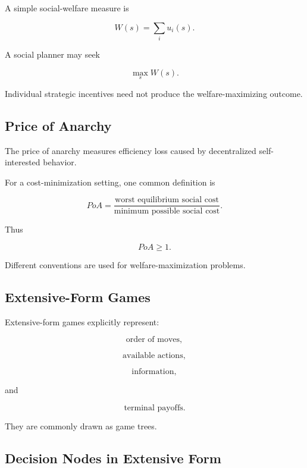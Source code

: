 A simple social-welfare measure is

\[
\boxed{
W(s)
=
\sum_i
u_i(s).
}
\]

A social planner may seek

\[
\boxed{
\max_s
W(s).
}
\]

Individual strategic incentives need not produce the welfare-maximizing
outcome.

\subsection{Price of Anarchy}
\label{subsec:price-of-anarchy}

The price of anarchy measures efficiency loss caused by decentralized
self-interested behavior.

For a cost-minimization setting, one common definition is

\[
\boxed{
PoA
=
\frac{
\text{worst equilibrium social cost}
}{
\text{minimum possible social cost}
}.
}
\]

Thus

\[
\boxed{
PoA\geq1.
}
\]

Different conventions are used for welfare-maximization problems.

\subsection{Extensive-Form Games}
\label{subsec:extensive-form-games}

Extensive-form games explicitly represent:

\[
\boxed{
\text{order of moves},
}
\]

\[
\boxed{
\text{available actions},
}
\]

\[
\boxed{
\text{information},
}
\]

and

\[
\boxed{
\text{terminal payoffs}.
}
\]

They are commonly drawn as game trees.

\subsection{Decision Nodes in Extensive Form}
\label{subsec:extensive-game-decision-nodes}


